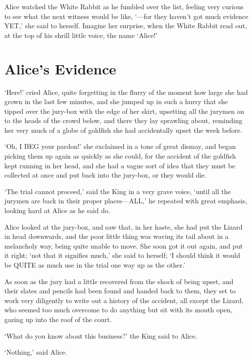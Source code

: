 \documentclass[12pt]{book}
\begin{document}
\begin{Parallel}[p]{}{}
{Alice watched the White Rabbit as he fumbled over the list, feeling very curious to see what the next witness would be like, ‘—for they haven’t got much evidence YET,’ she said to herself. Imagine her surprise, when the White Rabbit read out, at the top of his shrill little voice, the name ‘Alice!’




\section{Alice’s Evidence}


‘Here!’ cried Alice, quite forgetting in the flurry of the moment how large she had grown in the last few minutes, and she jumped up in such a hurry that she tipped over the jury-box with the edge of her skirt, upsetting all the jurymen on to the heads of the crowd below, and there they lay sprawling about, reminding her very much of a globe of goldfish she had accidentally upset the week before.

‘Oh, I BEG your pardon!’ she exclaimed in a tone of great dismay, and began picking them up again as quickly as she could, for the accident of the goldfish kept running in her head, and she had a vague sort of idea that they must be collected at once and put back into the jury-box, or they would die.

‘The trial cannot proceed,’ said the King in a very grave voice, ‘until all the jurymen are back in their proper places—ALL,’ he repeated with great emphasis, looking hard at Alice as he said do.

Alice looked at the jury-box, and saw that, in her haste, she had put the Lizard in head downwards, and the poor little thing was waving its tail about in a melancholy way, being quite unable to move. She soon got it out again, and put it right; ‘not that it signifies much,’ she said to herself; ‘I should think it would be QUITE as much use in the trial one way up as the other.’

As soon as the jury had a little recovered from the shock of being upset, and their slates and pencils had been found and handed back to them, they set to work very diligently to write out a history of the accident, all except the Lizard, who seemed too much overcome to do anything but sit with its mouth open, gazing up into the roof of the court.

‘What do you know about this business?’ the King said to Alice.

‘Nothing,’ said Alice.

}
\end{Parallel}
\end{document}
